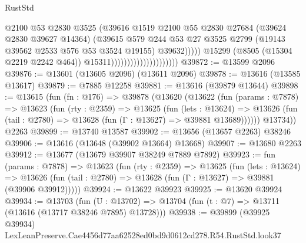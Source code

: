 \begin{lexlean}{RustStd}
\begin{coremodule}
                                                    @2100
                                                    @53
                                                    @2830
                                                    @3525
                                                    (@39616
                                                      @1519
                                                      @2100
                                                      @55
                                                      @2830
                                                      @27684
                                                      (@39624 @2830 @39627 @14364)
                                                      (@39615
                                                        @579
                                                        @244
                                                        @53
                                                        @27
                                                        @3525
                                                        @2799
                                                        (@19143 @39562 @2533 @576 @53 @3524 @19155)
                                                        @39632)))))
                                              @15299
                                              (@8505 (@15304 @2219 @2242 @464))
                                              @15311)))))))))))))))))))))
@39872 := @13599 @2096
@39876 := @13601 (@13605 @2096) (@13611 @2096)
@39878 := @13616 (@13585 @13617)
@39879 := @7885 @12258
@39881 := @13616 (@39879 @13644)
@39898 := @13615
    (fun (fn : @176) =>
    @39878
      (@13620
        (@13622
          (fun (params : @7878) =>
          @13623
            (fun (rty : @2359) =>
            @13625
              (fun (lets : @13624) =>
              @13626 (fun (tail : @2780) => @13628 (fun (Γ : @13627) => @39881 @13689))))))
        @13734))
    @2263
@39899 := @13740 @13587
@39902 := @13656 (@13657 @2263) @38246
@39906 := @13616 (@13648 (@39902 @13664) @13668)
@39907 := @13680 @2263
@39912 := @13677 (@13679 @39907 @38249 @7889 @7892)
@39923 := fun (params : @7878) =>
  @13623
    (fun (rty : @2359) =>
    @13625
      (fun (lets : @13624) =>
      @13626 (fun (tail : @2780) => @13628 (fun (Γ : @13627) => @39881 (@39906 @39912)))))
@39924 := @13622 @39923
@39925 := @13620 @39924
@39934 := @13703
    (fun (U : @13702) => @13704 (fun (t : @7) => @13711 (@13616 (@13717 @38246 @7895) @13728)))
@39938 := @39899
    (@39925 @39934)
    LexLeanPreserve.Cae4456d77aa62528ed0bd9d0612cd278.R54.RustStd.look37

\end{coremodule}
\end{lexlean}
